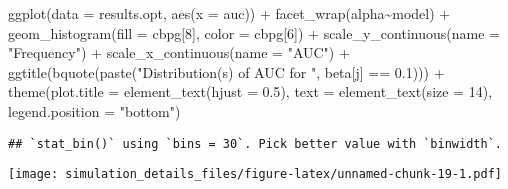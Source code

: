 \documentclass[
]{article}
\newenvironment{Shaded}{\begin{snugshade}}{\end{snugshade}}
\newcommand{\AttributeTok}[1]{\textcolor[rgb]{0.77,0.63,0.00}{#1}}
\newcommand{\DecValTok}[1]{\textcolor[rgb]{0.00,0.00,0.81}{#1}}
\newcommand{\FloatTok}[1]{\textcolor[rgb]{0.00,0.00,0.81}{#1}}
\newcommand{\FunctionTok}[1]{\textcolor[rgb]{0.00,0.00,0.00}{#1}}
\newcommand{\NormalTok}[1]{#1}
\newcommand{\SpecialCharTok}[1]{\textcolor[rgb]{0.00,0.00,0.00}{#1}}
\newcommand{\StringTok}[1]{\textcolor[rgb]{0.31,0.60,0.02}{#1}}
\begin{document}
\begin{Shaded}
\begin{Highlighting}[]
\FunctionTok{ggplot}\NormalTok{(}\AttributeTok{data =}\NormalTok{ results.opt,}
       \FunctionTok{aes}\NormalTok{(}\AttributeTok{x =}\NormalTok{ auc)) }\SpecialCharTok{+}
  \FunctionTok{facet\_wrap}\NormalTok{(alpha}\SpecialCharTok{\textasciitilde{}}\NormalTok{model) }\SpecialCharTok{+}
  \FunctionTok{geom\_histogram}\NormalTok{(}\AttributeTok{fill =}\NormalTok{ cbpg[}\DecValTok{8}\NormalTok{], }\AttributeTok{color =}\NormalTok{ cbpg[}\DecValTok{6}\NormalTok{]) }\SpecialCharTok{+}
  \FunctionTok{scale\_y\_continuous}\NormalTok{(}\AttributeTok{name =} \StringTok{"Frequency"}\NormalTok{) }\SpecialCharTok{+}
  \FunctionTok{scale\_x\_continuous}\NormalTok{(}\AttributeTok{name =} \StringTok{"AUC"}\NormalTok{) }\SpecialCharTok{+}
  \FunctionTok{ggtitle}\NormalTok{(}\FunctionTok{bquote}\NormalTok{(}\FunctionTok{paste}\NormalTok{(}\StringTok{"Distribution(s) of AUC for "}\NormalTok{, beta[j] }\SpecialCharTok{==} \FloatTok{0.1}\NormalTok{))) }\SpecialCharTok{+}
  \FunctionTok{theme}\NormalTok{(}\AttributeTok{plot.title =} \FunctionTok{element\_text}\NormalTok{(}\AttributeTok{hjust =} \FloatTok{0.5}\NormalTok{), }
        \AttributeTok{text =} \FunctionTok{element\_text}\NormalTok{(}\AttributeTok{size =} \DecValTok{14}\NormalTok{),}
        \AttributeTok{legend.position =} \StringTok{"bottom"}\NormalTok{)}
\end{Highlighting}
\end{Shaded}

\begin{verbatim}
## `stat_bin()` using `bins = 30`. Pick better value with `binwidth`.
\end{verbatim}

\texttt{[image: simulation\_details\_files/figure-latex/unnamed-chunk-19-1.pdf]}
\end{document}
